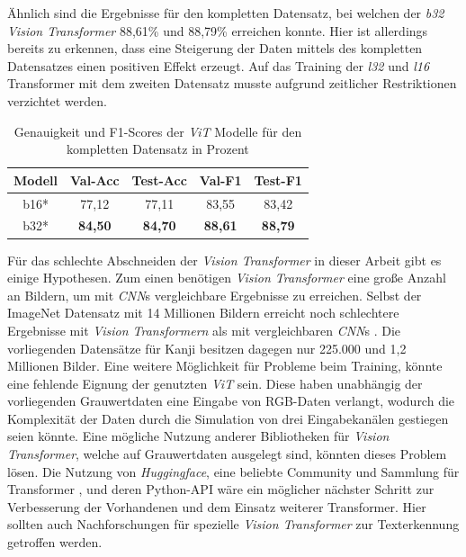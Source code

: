 \documentclass[twoside,a4paper]{IEEEtran}
\begin{document}
Ähnlich sind die Ergebnisse für den kompletten Datensatz, bei welchen der \emph{b32} \emph{Vision Transformer} 88,61\% und 88,79\% erreichen konnte. Hier ist allerdings bereits zu erkennen, dass eine Steigerung der Daten mittels des kompletten Datensatzes einen positiven Effekt erzeugt. Auf das Training der \emph{l32} und \emph{l16} Transformer mit dem zweiten Datensatz musste aufgrund zeitlicher Restriktionen verzichtet werden.
\begin{table}[!htb]
	\caption{Genauigkeit und F1-Scores der \emph{ViT} Modelle für den kompletten Datensatz in Prozent}
	\label{vit_ergebnis_full}
	\centering
	\begin{tabular}{|c|c|c|c|c|}
		\hline
		Modell & Val-Acc & Test-Acc & Val-F1 & Test-F1\\
		\hline
		\hline 
		b16* & 77,12 & 77,11 & 83,55 & 83,42\\
		\hline
		b32* & \textbf{84,50} & \textbf{84,70} & \textbf{88,61} & \textbf{88,79}\\
		\hline 
	\end{tabular}
\end{table}

Für das schlechte Abschneiden der \emph{Vision Transformer} in dieser Arbeit gibt es einige Hypothesen. Zum einen benötigen \emph{Vision Transformer} eine große Anzahl an Bildern, um mit \emph{CNN}s vergleichbare Ergebnisse zu erreichen. Selbst der ImageNet Datensatz mit 14 Millionen Bildern \cite{IMAGENET} erreicht noch schlechtere Ergebnisse mit \emph{Vision Transformern} als mit vergleichbaren \emph{CNN}s \cite{JFT}. Die vorliegenden Datensätze für Kanji besitzen dagegen nur 225.000 und 1,2 Millionen Bilder. Eine weitere Möglichkeit für Probleme beim Training, könnte eine fehlende Eignung der genutzten \emph{ViT} sein. Diese haben unabhängig der vorliegenden Grauwertdaten eine Eingabe von RGB-Daten verlangt, wodurch die Komplexität der Daten durch die Simulation von drei Eingabekanälen gestiegen seien könnte. Eine mögliche Nutzung anderer Bibliotheken für \emph{Vision Transformer}, welche auf Grauwertdaten ausgelegt sind, könnten dieses Problem lösen. Die Nutzung von \emph{Huggingface}, eine beliebte Community und Sammlung für Transformer \cite{huggingface}, und deren Python-API wäre ein möglicher nächster Schritt zur Verbesserung der Vorhandenen und dem Einsatz weiterer Transformer. Hier sollten auch Nachforschungen für spezielle \emph{Vision Transformer} zur Texterkennung getroffen werden. 
\end{document}
